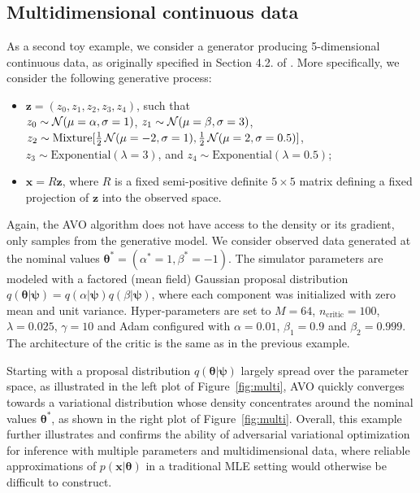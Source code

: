 \documentclass[twocolumn,superscriptaddress,aps]{revtex4-1}
\newcommand{\bftheta}{{\bm \theta}}
\newcommand{\bfpsi}{{\bm \psi}}
\newcommand{\bfz}{\mathbf{z}}
\theoremstyle{plain}
\begin{document}
\subsection{Multidimensional continuous data}

As a second toy example, we consider a generator producing
5-dimensional continuous data, as originally specified in Section 4.2. of
\citep{cranmer2015approximating}. More specifically, we consider the following
generative process:
\begin{itemize}
    \item $\bfz = (z_0, z_1, z_2, z_3, z_4)$, such that \\
        $z_0 \sim {\cal N}(\mu=\alpha, \sigma=1)$,
        $z_1 \sim {\cal N}(\mu=\beta, \sigma=3)$,
        $z_2 \sim {\text{Mixture}}[\frac{1}{2}\,{\cal N}(\mu=-2, \sigma=1), \\  \frac{1}{2}\,{\cal N}(\mu=2, \sigma=0.5)]$,
        $z_3 \sim {\text{Exponential}(\lambda=3)}$, and
        $z_4 \sim {\text{Exponential}(\lambda=0.5)}$;
    \item $\mathbf{x} = R  \bfz$, where $R$ is a fixed
    semi-positive definite $5 \times 5$ matrix defining a fixed projection
    of $\bfz$ into the observed space.
\end{itemize}
Again, the AVO algorithm does not have access to the density or its gradient, only samples from the generative model.
We consider observed data generated at the nominal values $\bftheta^* = (\alpha^*=1,\beta^*=-1)$.
The simulator parameters are modeled with a factored  (mean field) Gaussian
proposal distribution $q(\bftheta|\bfpsi) = q(\alpha|\bfpsi) q(\beta|\bfpsi)$, where each component was
initialized with zero mean and unit variance.
Hyper-parameters are set to $M=64$, $n_\text{critic}=100$, $\lambda=0.025$, $\gamma=10$ and
Adam configured with $\alpha=0.01$, $\beta_1=0.9$ and $\beta_2=0.999$.
The architecture of the critic is the same as in the previous example.


Starting with a proposal distribution $q(\bftheta|\bfpsi)$ largely spread over
the parameter space, as illustrated in the left plot of Figure~\ref{fig:multi},
AVO quickly converges towards a variational distribution whose density
concentrates around the nominal values $\bftheta^*$, as shown in the right plot of Figure~\ref{fig:multi}.
Overall, this example further illustrates and confirms the ability of adversarial
variational optimization for inference with multiple parameters and multidimensional
data, where reliable approximations of $p(\mathbf{x}|\bftheta)$ in a traditional
MLE setting would otherwise be difficult to construct.
\end{document}
